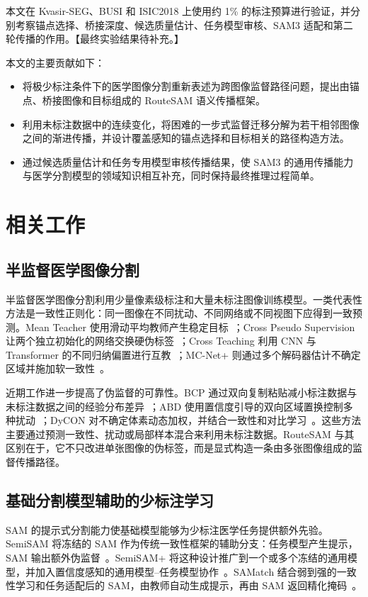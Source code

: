\documentclass[UTF8,a4paper,10pt]{ctexart}
\begin{document}
本文在 Kvasir-SEG、BUSI 和 ISIC2018 上使用约 1\% 的标注预算进行验证，并分别考察锚点选择、桥接深度、候选质量估计、任务模型审核、SAM3 适配和第二轮传播的作用。【最终实验结果待补充。】

本文的主要贡献如下：
\begin{itemize}
    \item 将极少标注条件下的医学图像分割重新表述为跨图像监督路径问题，提出由锚点、桥接图像和目标组成的 RouteSAM 语义传播框架。
    \item 利用未标注数据中的连续变化，将困难的一步式监督迁移分解为若干相邻图像之间的渐进传播，并设计覆盖感知的锚点选择和目标相关的路径构造方法。
    \item 通过候选质量估计和任务专用模型审核传播结果，使 SAM3 的通用传播能力与医学分割模型的领域知识相互补充，同时保持最终推理过程简单。
\end{itemize}

\section{相关工作}

\subsection{半监督医学图像分割}

半监督医学图像分割利用少量像素级标注和大量未标注图像训练模型。一类代表性方法是一致性正则化：同一图像在不同扰动、不同网络或不同视图下应得到一致预测。Mean Teacher 使用滑动平均教师产生稳定目标~\cite{tarvainen2017meanteacher}；Cross Pseudo Supervision 让两个独立初始化的网络交换硬伪标签~\cite{chen2021cps}；Cross Teaching 利用 CNN 与 Transformer 的不同归纳偏置进行互教~\cite{luo2022crossteaching}；MC-Net+ 则通过多个解码器估计不确定区域并施加软一致性~\cite{wu2022mcnet}。

近期工作进一步提高了伪监督的可靠性。BCP 通过双向复制粘贴减小标注数据与未标注数据之间的经验分布差异~\cite{bai2023bcp}；ABD 使用置信度引导的双向区域置换控制多种扰动~\cite{chi2024abd}；DyCON 对不确定体素动态加权，并结合一致性和对比学习~\cite{assefa2025dycon}。这些方法主要通过预测一致性、扰动或局部样本混合来利用未标注数据。RouteSAM 与其区别在于，它不只改进单张图像的伪标签，而是显式构造一条由多张图像组成的监督传播路径。

\subsection{基础分割模型辅助的少标注学习}

SAM 的提示式分割能力使基础模型能够为少标注医学任务提供额外先验。SemiSAM 将冻结的 SAM 作为传统一致性框架的辅助分支：任务模型产生提示，SAM 输出额外伪监督~\cite{zhang2023semisam}。SemiSAM+ 将这种设计推广到一个或多个冻结的通用模型，并加入置信度感知的通用模型--任务模型协作~\cite{zhang2025semisamplus}。SAMatch 结合弱到强的一致性学习和任务适配后的 SAM，由教师自动生成提示，再由 SAM 返回精化掩码~\cite{xu2024samatch}。
\end{document}
